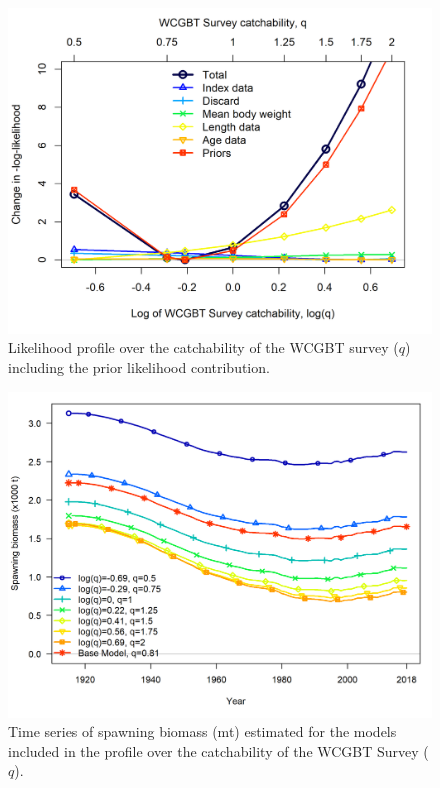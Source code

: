 \documentclass[12pt,]{article}
\begin{document}
\begin{figure}
\centering
\includegraphics{Figures/profile_Q.png}
\caption{Likelihood profile over the catchability of the WCGBT survey
(\(q\)) including the prior likelihood
contribution.\label{fig:profile_logQ}}
\end{figure}

\begin{figure}
\centering
\includegraphics{Figures/profile_Q_compare1_spawnbio.png}
\caption{Time series of spawning biomass (mt) estimated for the models
included in the profile over the catchability of the WCGBT Survey
(\(q\)).\label{fig:profile_Q_compare1_spawnbio}}
\end{figure}
\end{document}
